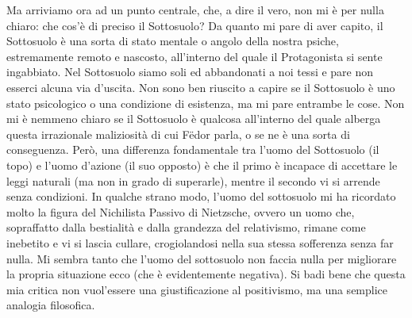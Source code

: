 \documentclass[12pt,a4paper]{report}
\theoremstyle{definition}
\theoremstyle{Theorem}
\theoremstyle{definition}
\theoremstyle{definition}
\theoremstyle{definition}
\begin{document}
Ma arriviamo ora ad un punto centrale, che, a dire il vero, non mi è per nulla chiaro: che cos'è di preciso il Sottosuolo? Da quanto mi pare di aver capito, il Sottosuolo è una sorta di stato mentale o angolo della nostra psiche, estremamente remoto e nascosto, all'interno del quale il Protagonista si sente ingabbiato. Nel Sottosuolo siamo soli ed abbandonati a noi tessi e pare non esserci alcuna via d'uscita. Non sono ben riuscito a capire se il Sottosuolo è uno stato psicologico o una condizione di esistenza, ma mi pare entrambe le cose. Non mi è nemmeno chiaro se il Sottosuolo è qualcosa all'interno del quale alberga questa irrazionale maliziosità di cui Fëdor parla, o se ne è una sorta di conseguenza. Però, una differenza fondamentale tra l'uomo del Sottosuolo (il topo) e l'uomo d'azione (il suo opposto) è che il primo è incapace di accettare le leggi naturali (ma non in grado di superarle), mentre il secondo vi si arrende senza condizioni. In qualche strano modo, l'uomo del sottosuolo mi ha ricordato molto la figura del Nichilista Passivo di Nietzsche, ovvero un uomo che, sopraffatto dalla bestialità e dalla grandezza del relativismo, rimane come inebetito e vi si lascia cullare, crogiolandosi nella sua stessa sofferenza senza far nulla. Mi sembra tanto che l'uomo del sottosuolo non faccia nulla per migliorare la propria situazione ecco (che è evidentemente negativa). Si badi bene che questa mia critica non vuol'essere una giustificazione al positivismo, ma una semplice analogia filosofica.
\end{document}
